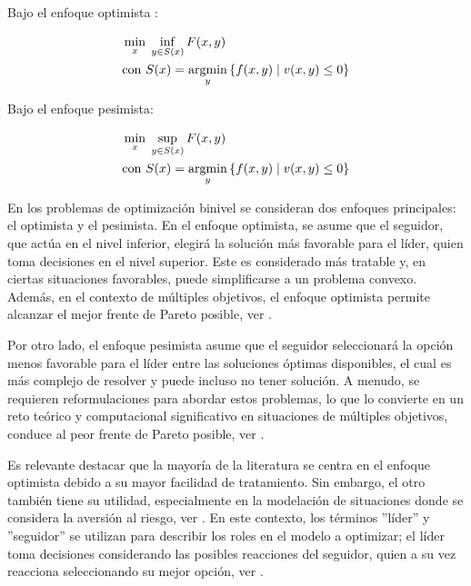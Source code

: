 \begin{center}   
Bajo el enfoque optimista :
\end{center}
\begin{equation}
\begin{aligned}
& \min_{x} \; \inf_{y \in S(x)} F(x, y) \\
& \text{con } S(x) = \operatorname*{argmin}_{y} \left\{ f(x, y) \mid v(x, y) \leq 0 \right\}
\end{aligned}
\label{eq:EnfoqueOptimistaGeneral}
\end{equation}
 
\begin{center}
    Bajo el enfoque pesimista:
\end{center}
\begin{equation}
\begin{aligned}
& \min_{x} \; \sup_{y \in S(x)} F(x, y) \\
& \text{con } S(x) = \operatorname*{argmin}_{y} \left\{ f(x, y) \mid v(x, y) \leq 0 \right\}
\end{aligned}
\label{eq:EnfoquePesimistaGeneral}
\end{equation}


En los problemas de optimización binivel se consideran dos enfoques principales: el optimista y el pesimista. En el enfoque optimista, se asume que el seguidor, que actúa en el nivel inferior, elegirá la solución más favorable para el líder, quien toma decisiones en el nivel superior. Este es considerado más tratable y, en ciertas situaciones favorables, puede simplificarse a un problema convexo. Además, en el contexto de múltiples objetivos, el enfoque optimista permite alcanzar el mejor frente de Pareto posible, ver \cite{DempeyZemkoho2020}.

Por otro lado, el enfoque pesimista asume que el seguidor seleccionará la opción menos favorable para el líder entre las soluciones óptimas disponibles, el cual es más complejo de resolver y puede incluso no tener solución. A menudo, se requieren reformulaciones para abordar estos problemas, lo que lo convierte en un reto teórico y computacional significativo en situaciones de múltiples objetivos, conduce al peor frente de Pareto posible, ver \cite{Sinha2017ARO}.

Es relevante destacar que la mayoría de la literatura se centra en el enfoque optimista debido a su mayor facilidad de tratamiento. Sin embargo, el otro también tiene su utilidad, especialmente en la modelación de situaciones donde se considera la aversión al riesgo, ver \cite{DempeyZemkoho2020}. En este contexto, los términos ''líder'' y ''seguidor'' se utilizan para describir los roles en el modelo a optimizar; el líder toma decisiones considerando las posibles reacciones del seguidor, quien a su vez reacciona seleccionando su mejor opción, ver \cite{Sinha2017ARO}.

